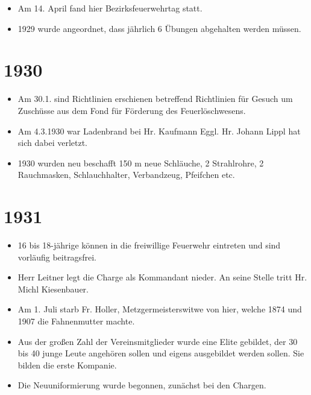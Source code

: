 \documentclass[12pt,a4paper]{book}
\begin{document}
\begin{itemize}
\item Am 14. April fand hier Bezirksfeuerwehrtag statt.

\item 1929 wurde angeordnet, dass jährlich 6 Übungen abgehalten werden müssen.
\end{itemize}

\section*{1930}

\begin{itemize}
\item Am 30.1. sind Richtlinien erschienen betreffend Richtlinien für Gesuch um
Zuschüsse aus dem Fond für Förderung des Feuerlöschwesens.

\item Am 4.3.1930 war Ladenbrand bei Hr. Kaufmann Eggl. Hr. Johann Lippl hat
sich dabei verletzt.

\item 1930 wurden neu beschafft 150 m neue Schläuche, 2 Strahlrohre, 2
Rauchmasken, Schlauchhalter, Verbandzeug, Pfeifchen etc.
\end{itemize}

\section*{1931}

\begin{itemize}
\item 16 bis 18-jährige können in die freiwillige Feuerwehr eintreten und sind
vorläufig beitragsfrei.

\item Herr Leitner legt die Charge als Kommandant nieder. An seine Stelle tritt
Hr. Michl Kiesenbauer.

\item Am 1. Juli starb Fr. Holler, Metzgermeisterswitwe von hier, welche 1874
und 1907 die Fahnenmutter machte.

\item Aus der großen Zahl der Vereinsmitglieder wurde eine Elite gebildet, der
30 bis 40 junge Leute angehören sollen und eigens ausgebildet werden sollen. Sie
bilden die erste Kompanie.

\item Die Neuuniformierung wurde begonnen, zunächst bei den Chargen.
\end{itemize}
\end{document}

